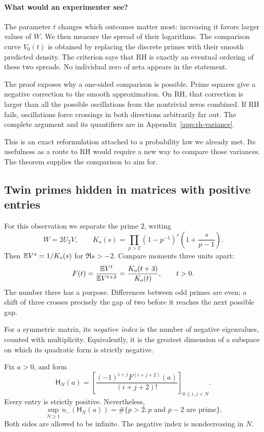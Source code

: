 \paragraph{What would an experimenter see?}
The parameter $t$ changes which outcomes matter most: increasing it
favors larger values of $W$. We then measure the spread of their
logarithms. The comparison curve $V_0(t)$ is obtained by replacing the
discrete primes with their smooth predicted density. The criterion
says that RH is exactly an eventual ordering of these two spreads.
No individual zero of zeta appears in the statement.

The proof exposes why a one-sided comparison is possible. Prime squares
give a negative correction to the smooth approximation. On RH, that
correction is larger than all the possible oscillations from the
nontrivial zeros combined. If RH fails, oscillations force crossings
in both directions arbitrarily far out. The complete argument and its
quantifiers are in Appendix~\ref{app:rh-variance}.

This is an exact reformulation attached to a probability law we already
met. Its usefulness as a route to RH would require a new way to compare
those variances. The theorem supplies the comparison to aim for.

\subsection{Twin primes hidden in matrices with positive entries}

For this observation we separate the prime \(2\), writing
\[
 W=2U_2V,\qquad
 K_o(s)=\prod_{p>2}(1-p^{-1})^s\left(1+\frac{s}{p-1}\right).
\]
Then \(\mathbb E V^s=1/K_o(s)\) for \(\Re s>-2\). Compare moments three units apart:
\[
 F(t)=\frac{\mathbb E V^t}{\mathbb E V^{t+3}}=\frac{K_o(t+3)}{K_o(t)},\qquad t>0.
\]
The number three has a purpose. Differences between odd primes are even;
a shift of three crosses precisely the gap of two before it reaches the next
possible gap.

For a symmetric matrix, its \emph{negative index} is the number of negative
eigenvalues, counted with multiplicity. Equivalently, it is the greatest
dimension of a subspace on which its quadratic form is strictly negative.

\begin{theorem}\label{cq:twins}
Fix \(a>0\), and form
\[
 \mathsf H_N(a)=
 \left[\frac{(-1)^{i+j}F^{(i+j+2)}(a)}{(i+j+2)!}\right]_{0\leq i,j<N}.
\]
Every entry is strictly positive. Nevertheless,
\[
 \sup_{N\geq1}n_-(\mathsf H_N(a))
   =\#\{p>2:p\text{ and }p-2\text{ are prime}\}.
\]
Both sides are allowed to be infinite. The negative index is nondecreasing
in \(N\).
\end{theorem}

